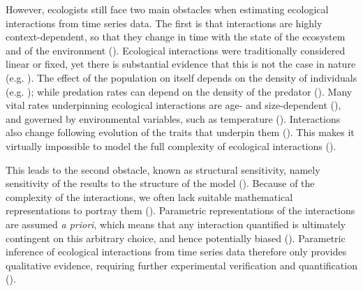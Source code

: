\documentclass[11pt, oneside]{article}
\begin{document}
However, ecologists still face two main obstacles when estimating ecological interactions from time series data.
The first is that interactions are highly context-dependent, so that they change in time with the state of the ecosystem and of the environment (\cite{Song2020}).
Ecological interactions were traditionally considered linear or fixed, yet there is substantial evidence that this is not the case in nature (e.g. \cite{Bonsall2003,Gross2005,Kendall2005,Ushio2018,Bruijning2019,Rosenbaum2019,Bonnaffe2021b}).
The effect of the population on itself depends on the density of individuals (e.g. \cite{Lingjaerde2001, Moe2005, Brook2006}); while predation rates can depend on the density of the predator (\cite{Jost2000,Yoshida2003}).
Many vital rates underpinning ecological interactions are age- and size-dependent (\cite{Bonnaffe2018,Bonnaffe2021b}), and governed by environmental variables, such as temperature (\cite{Brown2004a}).
Interactions also change following evolution of the traits that underpin them (\cite{Turchin2003,Yoshida2003}).
This makes it virtually impossible to model the full complexity of ecological interactions (\cite{Lawton1999,Kendall1999}).

This leads to the second obstacle, known as structural sensitivity, namely sensitivity of the results to the structure of the model (\cite{Wood2001,Adamson2013}).
Because of the complexity of the interactions, we often lack suitable mathematical representations to portray them (\cite{Jost2000,Wood2001,Ellner2002,Wu2005}).
Parametric representations of the interactions are assumed \textit{a priori}, which means that any interaction quantified is ultimately contingent on this arbitrary choice, and hence potentially biased (\cite{Jost2000,Wood2001,Ellner2002,Wu2005}).
Parametric inference of ecological interactions from time series data therefore only provides qualitative evidence, requiring further experimental verification and quantification (\cite{Kendall1999}). 
\end{document}
